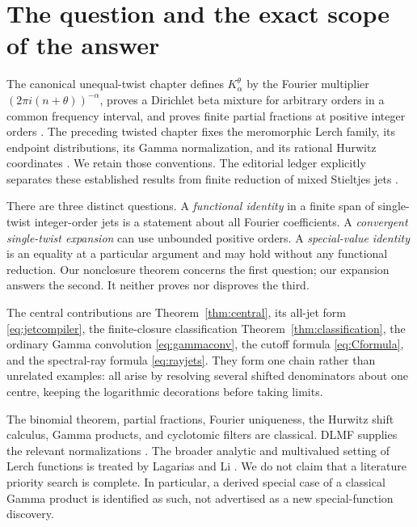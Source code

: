 \documentclass[11pt,a4paper]{article}
\numberwithin{equation}{section}
\theoremstyle{definition}\newtheorem{definition}[theorem]{Definition}
\theoremstyle{remark}\newtheorem{remark}[theorem]{Remark}
\begin{document}
\section{The question and the exact scope of the answer}
\label{sec:scope}
The canonical unequal-twist chapter defines $K_\alpha^\theta$ by the
Fourier multiplier $(2\pi i(n+\theta))^{-\alpha}$, proves a Dirichlet beta
mixture for arbitrary orders in a common frequency interval, and proves
finite partial fractions at positive integer orders \cite{repo-mixed}.
The preceding twisted chapter fixes the meromorphic Lerch family,
its endpoint distributions, its Gamma normalization, and its rational
Hurwitz coordinates \cite{repo-twisted}. We retain those conventions.
The editorial ledger explicitly separates these established results from
finite reduction of mixed Stieltjes jets \cite{repo-ledger}.

There are three distinct questions. A \emph{functional identity} in a
finite span of single-twist integer-order jets is a statement about all
Fourier coefficients. A \emph{convergent single-twist expansion} can use
unbounded positive orders. A \emph{special-value identity} is an equality
at a particular argument and may hold without any functional reduction.
Our nonclosure theorem concerns the first question; our expansion answers
the second. It neither proves nor disproves the third.

The central contributions are Theorem~\ref{thm:central}, its all-jet form
\eqref{eq:jetcompiler}, the finite-closure classification
Theorem~\ref{thm:classification}, the ordinary Gamma convolution
\eqref{eq:gammaconv}, the cutoff formula \eqref{eq:Cformula}, and the
spectral-ray formula \eqref{eq:rayjets}. They form one chain rather than
unrelated examples: all arise by resolving several shifted denominators
about one centre, keeping the logarithmic decorations before taking limits.

The binomial theorem, partial fractions, Fourier uniqueness, the Hurwitz
shift calculus, Gamma products, and cyclotomic filters are classical.
DLMF supplies the relevant normalizations \cite{dlmf-zeta,dlmf-lerch,dlmf-gamma,dlmf-polylog,dlmf-polygamma}.
The broader analytic and multivalued setting of Lerch functions is treated
by Lagarias and Li \cite{lagarias-li}. We do not claim that a literature
priority search is complete. In particular, a derived special case of a
classical Gamma product is identified as such, not advertised as a new
special-function discovery.
\end{document}
